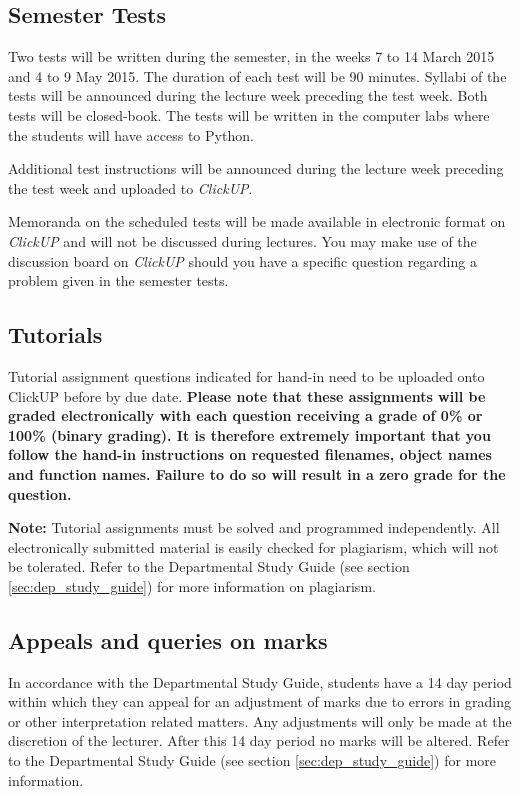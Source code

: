     \subsection{Semester Tests}
        Two tests will be written during the semester, in the weeks 7 to 14
        March 2015 and 4 to 9 May 2015. The duration of each test will be
        90 minutes. Syllabi of the tests will be announced during the lecture
        week preceding the test week. Both tests will be closed-book. The
        tests will be written in the computer labs where the students will
        have access to Python.

        Additional test instructions will be announced during the lecture
        week preceding the test week and uploaded to {\it ClickUP}.

        Memoranda on the scheduled tests will be made available in electronic
        format on {\it ClickUP} and will not be discussed during lectures. You
        may make use of the discussion board on {\it ClickUP} should you have a
        specific question regarding a problem given in the semester tests.

    \subsection{Tutorials}
        Tutorial assignment questions indicated for hand-in need to be
        uploaded onto ClickUP before by due date. \textbf{Please note that
        these assignments will be graded electronically with each
        question receiving a grade of 0\% or 100\% (binary grading). It
        is therefore extremely important that you follow the hand-in
        instructions on requested filenames, object names and function
        names. Failure to do so will result in a zero grade for the
        question.}

        \textbf{Note:} Tutorial assignments must be solved and programmed
        independently. All electronically submitted material is easily checked
        for plagiarism, which will not be tolerated. Refer to the Departmental
        Study Guide (see section \ref{sec:dep_study_guide}) for more
        information on plagiarism.

    \subsection{Appeals and queries on marks}
        In accordance with the Departmental Study Guide, students have a 14
        day period within which they can appeal for an adjustment of marks
        due to errors in grading or other interpretation related matters.
        Any adjustments will only be made at the discretion of the lecturer.
        After this 14 day period no marks will be altered. Refer to the
        Departmental Study Guide (see section \ref{sec:dep_study_guide})
        for more information.

